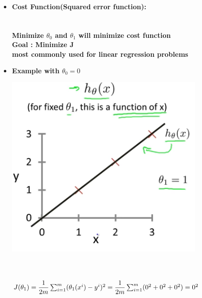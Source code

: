 \documentclass[12pt]{article}
\begin{document}
    \begin{itemize}
    \item \textbf{Cost Function(Squared error function): } \\\\\\\textbf{Minimize $\theta_0$ and $\theta_1$ will minimize cost function}\\\textbf{Goal : Minimize J}\\\textbf{most commonly used for linear regression problems}

    \item \textbf{Example with $\theta_0 = 0$} 
    \begin{center}
    \includegraphics[scale=0.5]{Example1.png}
    \end{center}
    \\\\
    $J(\theta_1)  = \dfrac{1}{2m} \sum_{i=1}^{m} (\theta_1(x^i) - y^i)^2\\ 
                  = \dfrac{1}{2m} \sum_{i=1}^{m} (0^2 + 0^2 + 0^2)\\ \\
                  = 0^2$


\end{itemize}
\end{document}
